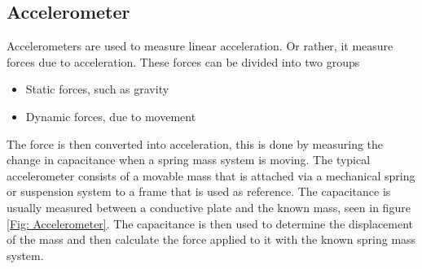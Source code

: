\documentclass[a4paper,11pt]{kth-mag}
\begin{document}
\subsection{Accelerometer} \label{sec: accelerometer}
Accelerometers are used to measure linear acceleration. Or rather, it measure forces due to acceleration. These forces can be divided into two groups
\begin{itemize}
\item Static forces, such as gravity
\item Dynamic forces, due to movement
\end{itemize}
The force is then converted into acceleration, this is done by measuring the change in capacitance when a spring mass system is moving. The typical accelerometer consists of a movable mass that is attached via a mechanical spring or suspension system to a frame that is used as reference. 
The capacitance is usually measured between a conductive plate and the known mass, seen in figure \ref{Fig: Accelerometer}. The capacitance is then used to determine the displacement of the mass and then calculate the force applied to it with the known spring mass system.
\end{document}
